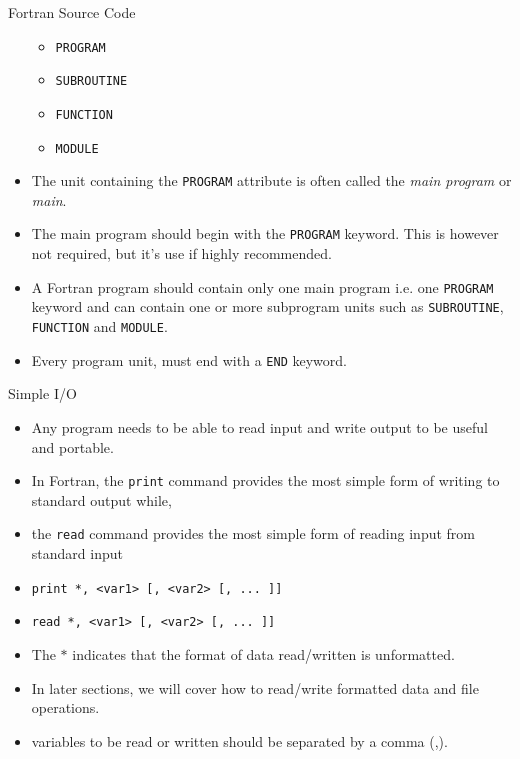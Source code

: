 \documentclass[c,mathserif,compress,xcolor=svgnames]{beamer}
\newcommand{\lstfortran}[1]{\lstinline[language={[90]Fortran},basicstyle=\footnotesize\ttfamily]|#1|}
\begin{document}
\begin{frame}{Fortran Source Code}
\begin{itemize}
      \begin{itemize}
        \item \lstfortran{PROGRAM}
        \item \lstfortran{SUBROUTINE}
        \item \lstfortran{FUNCTION}
        \item \lstfortran{MODULE}
      \end{itemize}
    \item The unit containing the \lstfortran{PROGRAM} attribute is often called the {\em main program} or {\em main}.
    \item The main program should begin with the \lstfortran{PROGRAM} keyword. This is however not required, but it's use if highly recommended.
    \item A Fortran program should contain only one main program i.e. one \lstfortran{PROGRAM} keyword and can contain one or more subprogram units such as \lstfortran{SUBROUTINE}, \lstfortran{FUNCTION} and \lstfortran{MODULE}.
    \item Every program unit, must end with a \lstfortran{END} keyword.
  \end{itemize}
\end{frame}

\begin{frame}{Simple I/O}
  \begin{itemize}
    \item Any program needs to be able to read input and write output to be useful and portable.
    \item In Fortran, the \lstfortran{print} command provides the most simple form of writing to standard output while,
    \item the \lstfortran{read} command provides the most simple form of reading input from standard input
    \item \lstfortran{print *, <var1> [, <var2> [, ... ]]}
    \item \lstfortran{read *, <var1> [, <var2> [, ... ]]}
    \item The $\ast$ indicates that the format of data read/written is unformatted.
    \item In later sections, we will cover how to read/write formatted data and file operations.
    \item variables to be read or written should be separated by a comma (,).
  \end{itemize}
\end{frame}
\end{document}
